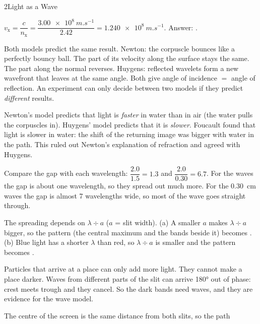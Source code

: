 \begin{chapteranswers}{2}{Light as a Wave}
  \item $v_\mathrm{x} = \dfrac{c}{n_\mathrm{x}} = \dfrac{\qty{3.00e8}{m.s^{-1}}}{2.42}
        = \qty{1.240e8}{m.s^{-1}}$. Answer: .
  \item Both models predict the same result. Newton: the corpuscle bounces like a
        perfectly bouncy ball. The part of its velocity along the surface stays the
        same. The part along the normal reverses. Huygens: reflected wavelets form a
        new wavefront that leaves at the same angle. Both give angle of incidence $=$
        angle of reflection. An experiment can only decide between two models if they
        predict \emph{different} results.
  \item Newton's model predicts that light is \emph{faster} in water than in air (the
        water pulls the corpuscles in). Huygens' model predicts that it is
        \emph{slower}. Foucault found that light is slower in water: the shift of the
        returning image was bigger with water in the path. This ruled out Newton's
        explanation of refraction and agreed with Huygens.
  \item Compare the gap with each wavelength: $\dfrac{2.0}{1.5} = 1.3$ and
        $\dfrac{2.0}{0.30} = 6.7$. For the  waves the gap
        is about one wavelength, so they spread out much more. For the \qty{0.30}{cm}
        waves the gap is almost 7 wavelengths wide, so most of the wave goes straight
        through.
  \item The spreading depends on $\lambda \div a$ ($a$ = slit width).
        (a) A smaller $a$ makes $\lambda \div a$ bigger, so the pattern (the central
        maximum and the bands beside it) becomes .
        (b) Blue light has a shorter $\lambda$ than red, so $\lambda \div a$ is smaller and
        the pattern becomes .
  \item Particles that arrive at a place can only add more light. They cannot make a place
        darker. Waves from different parts of the slit can arrive \ang{180} out of phase:
        crest meets trough and they cancel. So the dark bands need waves, and they are
        evidence for the wave model.
  \item The centre of the screen is the same distance from both slits, so the path

\end{chapteranswers}
